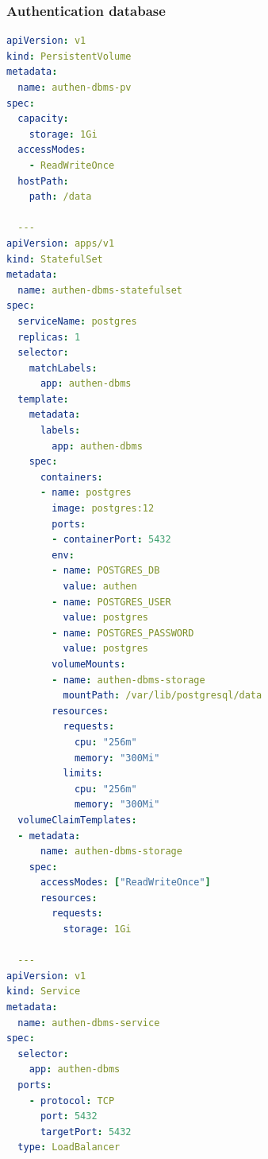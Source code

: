 \subsubsection*{Authentication database}
\begin{lstlisting}[language=yaml]
apiVersion: v1
kind: PersistentVolume
metadata:
  name: authen-dbms-pv
spec:
  capacity:
    storage: 1Gi
  accessModes:
    - ReadWriteOnce
  hostPath:
    path: /data

  ---
apiVersion: apps/v1
kind: StatefulSet
metadata:
  name: authen-dbms-statefulset
spec:
  serviceName: postgres
  replicas: 1
  selector:
    matchLabels:
      app: authen-dbms
  template:
    metadata:
      labels:
        app: authen-dbms
    spec:
      containers:
      - name: postgres
        image: postgres:12
        ports:
        - containerPort: 5432
        env:
        - name: POSTGRES_DB
          value: authen
        - name: POSTGRES_USER
          value: postgres
        - name: POSTGRES_PASSWORD
          value: postgres
        volumeMounts:
        - name: authen-dbms-storage
          mountPath: /var/lib/postgresql/data
        resources:
          requests:
            cpu: "256m"
            memory: "300Mi"
          limits:
            cpu: "256m"
            memory: "300Mi"
  volumeClaimTemplates:
  - metadata:
      name: authen-dbms-storage
    spec:
      accessModes: ["ReadWriteOnce"]
      resources:
        requests:
          storage: 1Gi

  ---
apiVersion: v1
kind: Service
metadata:
  name: authen-dbms-service
spec:
  selector:
    app: authen-dbms
  ports:
    - protocol: TCP
      port: 5432
      targetPort: 5432
  type: LoadBalancer
\end{lstlisting}

